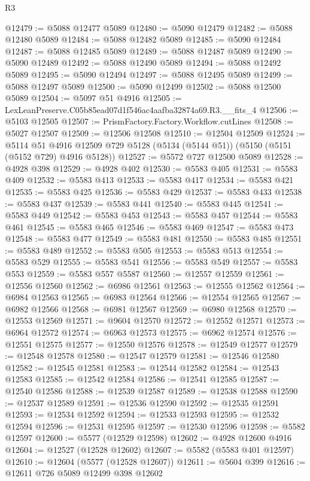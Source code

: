 \begin{lexlean}{R3}
\begin{coremodule}
@12479 := @5088 @12477 @5089
@12480 := @5090 @12479
@12482 := @5088 @12480 @5089
@12484 := @5088 @12482 @5089
@12485 := @5090 @12484
@12487 := @5088 @12485 @5089
@12489 := @5088 @12487 @5089
@12490 := @5090 @12489
@12492 := @5088 @12490 @5089
@12494 := @5088 @12492 @5089
@12495 := @5090 @12494
@12497 := @5088 @12495 @5089
@12499 := @5088 @12497 @5089
@12500 := @5090 @12499
@12502 := @5088 @12500 @5089
@12504 := @5097 @51 @4916
@12505 := LexLeanPreserve.C05b85ead07d1f546ac4aafba32874a69.R3.__fits_4
@12506 := @5103 @12505
@12507 := PrismFactory.Factory.Workflow.cutLines
@12508 := @5027 @12507
@12509 := @12506 @12508
@12510 := @12504 @12509
@12524 := @5114
    @51
    @4916
    @12509
    @729
    @5128
    (@5134 (@5144 @51))
    (@5150 (@5151 (@5152 @729) @4916 @5128))
@12527 := @5572 @727 @12500 @5089
@12528 := @4928 @398
@12529 := @4928 @402
@12530 := @5583 @405
@12531 := @5583 @409
@12532 := @5583 @413
@12533 := @5583 @417
@12534 := @5583 @421
@12535 := @5583 @425
@12536 := @5583 @429
@12537 := @5583 @433
@12538 := @5583 @437
@12539 := @5583 @441
@12540 := @5583 @445
@12541 := @5583 @449
@12542 := @5583 @453
@12543 := @5583 @457
@12544 := @5583 @461
@12545 := @5583 @465
@12546 := @5583 @469
@12547 := @5583 @473
@12548 := @5583 @477
@12549 := @5583 @481
@12550 := @5583 @485
@12551 := @5583 @489
@12552 := @5583 @505
@12553 := @5583 @513
@12554 := @5583 @529
@12555 := @5583 @541
@12556 := @5583 @549
@12557 := @5583 @553
@12559 := @5583 @557 @5587
@12560 := @12557 @12559
@12561 := @12556 @12560
@12562 := @6986 @12561
@12563 := @12555 @12562
@12564 := @6984 @12563
@12565 := @6983 @12564
@12566 := @12554 @12565
@12567 := @6982 @12566
@12568 := @6981 @12567
@12569 := @6980 @12568
@12570 := @12553 @12569
@12571 := @9604 @12570
@12572 := @12552 @12571
@12573 := @6964 @12572
@12574 := @6963 @12573
@12575 := @6962 @12574
@12576 := @12551 @12575
@12577 := @12550 @12576
@12578 := @12549 @12577
@12579 := @12548 @12578
@12580 := @12547 @12579
@12581 := @12546 @12580
@12582 := @12545 @12581
@12583 := @12544 @12582
@12584 := @12543 @12583
@12585 := @12542 @12584
@12586 := @12541 @12585
@12587 := @12540 @12586
@12588 := @12539 @12587
@12589 := @12538 @12588
@12590 := @12537 @12589
@12591 := @12536 @12590
@12592 := @12535 @12591
@12593 := @12534 @12592
@12594 := @12533 @12593
@12595 := @12532 @12594
@12596 := @12531 @12595
@12597 := @12530 @12596
@12598 := @5582 @12597
@12600 := @5577 (@12529 @12598)
@12602 := @4928 @12600 @4916
@12604 := @12527 (@12528 @12602)
@12607 := @5582 (@5583 @401 @12597)
@12610 := @12604 (@5577 (@12528 @12607))
@12611 := @5604 @399
@12616 := @12611 @726 @5089 @12499 @398 @12602

\end{coremodule}
\end{lexlean}
